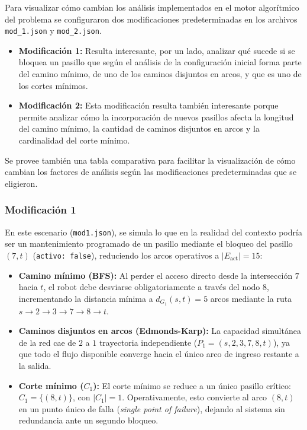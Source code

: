\documentclass[12pt,a4paper]{article}
\begin{document}
Para visualizar cómo cambian los análisis implementados en el motor algorítmico del problema se configuraron dos modificaciones predeterminadas en los archivos \texttt{mod\_1.json} y \texttt{mod\_2.json}.

\begin{itemize}
\item
  \textbf{Modificación 1:} Resulta interesante, por un lado, analizar qué sucede si se bloquea un pasillo que según el análisis de la configuración inicial forma parte del camino mínimo, de uno de los caminos disjuntos en arcos, y que es uno de los cortes mínimos.
\item
  \textbf{Modificación 2:} Esta modificación resulta también interesante porque permite analizar cómo la incorporación de nuevos pasillos afecta la longitud del camino mínimo, la cantidad de caminos disjuntos en arcos y la cardinalidad del corte mínimo.
\end{itemize}

Se provee también una tabla comparativa para facilitar la visualización de cómo cambian los factores de análisis según las modificaciones predeterminadas que se eligieron.

\subsubsection{Modificación 1}\label{modificaciuxf3n-1}

En este escenario (\texttt{mod1.json}), se simula lo que en la realidad del contexto podría ser un mantenimiento programado de un pasillo mediante el bloqueo del pasillo \((7, t)\) (\texttt{activo: false}), reduciendo los arcos operativos a \(\vert{}E_{\text{act}}\vert{} = 15\):

\begin{itemize}
\item
  \textbf{Camino mínimo (BFS):} Al perder el acceso directo desde la intersección \(7\) hacia \(t\), el robot debe desviarse obligatoriamente a través del nodo \(8\), incrementando la distancia mínima a \(d_{G_1}(s, t) = 5\) arcos mediante la ruta \(s \to 2 \to 3 \to 7 \to 8 \to t\).
\item
  \textbf{Caminos disjuntos en arcos (Edmonds-Karp):} La capacidad simultánea de la red cae de \(2\) a \(1\) trayectoria independiente (\(P_1 = (s, 2, 3, 7, 8, t)\)), ya que todo el flujo disponible converge hacia el único arco de ingreso restante a la salida.
\item
  \textbf{Corte mínimo (\(C_1\)):} El corte mínimo se reduce a un único pasillo crítico: \(C_1 = \{(8, t)\}\), con \(\vert{}C_1\vert{} = 1\). Operativamente, esto convierte al arco \((8, t)\) en un punto único de falla (\emph{single point of failure}), dejando al sistema sin redundancia ante un segundo bloqueo.
\end{itemize}
\end{document}
